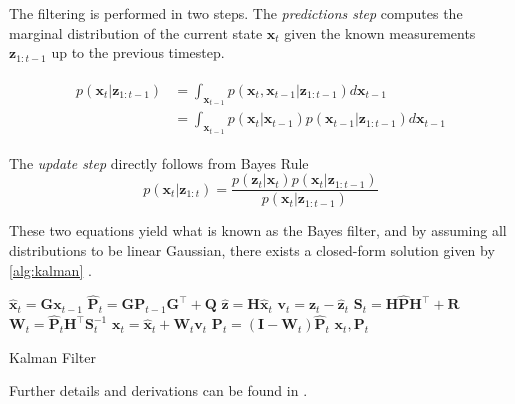 The filtering is performed in two steps.
The \textit{predictions step} computes the marginal distribution of the current state $\boldsymbol{x}_t$ given the known measurements $\boldsymbol{z}_{1:t-1}$ up to the previous timestep.

\begin{align}
    \begin{split}
    p(\boldsymbol{x}_t | \boldsymbol{z}_{1:t-1}) &= \int_{\boldsymbol{x}_{t-1}} p(\boldsymbol{x}_t, \boldsymbol{x}_{t-1} | \boldsymbol{z}_{1:t-1})d\boldsymbol{x}_{t-1}\\ &= \int_{\boldsymbol{x}_{t-1}} p(\boldsymbol{x}_t | \boldsymbol{x}_{t-1}) p(\boldsymbol{x}_{t-1} | \boldsymbol{z}_{1:t-1})d\boldsymbol{x}_{t-1}
    \end{split}
\end{align}

The \textit{update step} directly follows from Bayes Rule
\begin{equation}
    p(\boldsymbol{x}_t | \boldsymbol{z}_{1:t}) = \frac{p(\boldsymbol{z}_{t} | \boldsymbol{x}_{t}) p(\boldsymbol{x}_t | \boldsymbol{z}_{1:t-1})}{p(\boldsymbol{x}_t | \boldsymbol{z}_{1:t-1})}
\end{equation}

These two equations yield what is known as the Bayes filter, and by assuming all distributions to be linear Gaussian, there exists a closed-form solution given by \cref{alg:kalman} \cite{murphy, sensorfusjon}.

\begin{algorithm}
    \begin{algorithmic}[1]
        \State $\hat{\boldsymbol{x}}_t = \boldsymbol{G}\boldsymbol{x}_{t-1}$
        \State $\hat{\boldsymbol{P}}_t = \boldsymbol{G}\boldsymbol{P}_{t-1}\boldsymbol{G}^\intercal + \boldsymbol{Q}$
        \State $\hat{\boldsymbol{z}} = \boldsymbol{H}\hat{\boldsymbol{x}}_t$
        \State $\boldsymbol{v}_t = \boldsymbol{z}_t - \hat{\boldsymbol{z}}_t$
        \State $\boldsymbol{S}_t = \boldsymbol{H}\hat{\boldsymbol{P}} \boldsymbol{H}^\intercal + \boldsymbol{R}$
        \State $\boldsymbol{W}_t = \hat{\boldsymbol{P}}_t \boldsymbol{H}^\intercal \boldsymbol{S}_t^{-1}$
        \State $\boldsymbol{x}_t = \hat{\boldsymbol{x}}_t + \boldsymbol{W}_t \boldsymbol{v}_t$
        \State $\boldsymbol{P}_t = (\boldsymbol{I} - \boldsymbol{W}_t) \hat{\boldsymbol{P}}_t$
        \State \Return $\boldsymbol{x}_t, \boldsymbol{P}_t$
        \EndProcedure
    \end{algorithmic}
    \caption{Kalman Filter}
    \label{alg:kalman}
\end{algorithm}

Further details and derivations can be found in \cite{murphy, sensorfusjon}.


